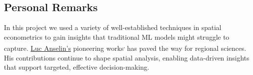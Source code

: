 \documentclass[
	a4paper, %
	10pt, %
	unnumberedsections, %
	twoside, %
]{LTJournalArticle}
\begin{document}
\subsection{Personal Remarks}

In this project we used a variety of well-established techniques in spatial econometrics to gain insights that traditional ML models might struggle to capture. \href{https://en.wikipedia.org/wiki/Luc_Anselin}{Luc Anselin's} pioneering works\textsuperscript{\cite{Anselin1988}, \cite{Anselin1995}} has paved the way for regional sciences. His contributions continue to shape spatial analysis, enabling data-driven insights that support targeted, effective decision-making.



\pagebreak
\clearpage

\onecolumn
\end{document}
